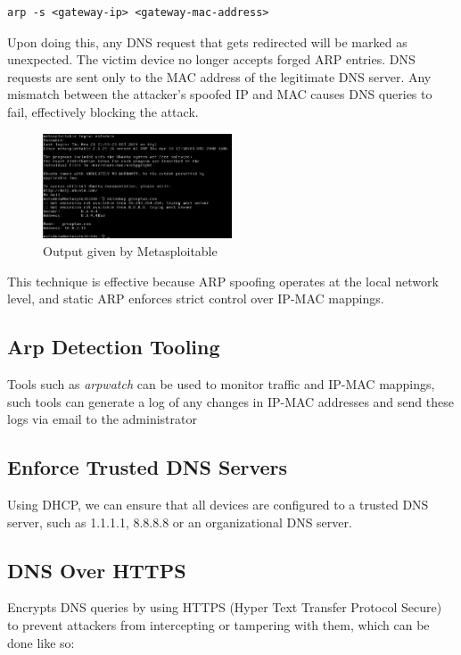 \documentclass[conference,letterpaper]{IEEEtran}
\begin{document}
\begin{lstlisting}
arp -s <gateway-ip> <gateway-mac-address>
\end{lstlisting}

Upon doing this, any DNS request that gets redirected will be marked as unexpected. The victim device no longer accepts forged ARP entries. DNS requests are sent only to the MAC address of the legitimate DNS server. Any mismatch between the attacker’s spoofed IP and MAC causes DNS queries to fail, effectively blocking the attack.\cite{dataDefenseARPSpoofing2018}

\begin{figure}[ht]
  \centering
  \includegraphics[width=0.5\textwidth]{figures/output.jpeg}
  \caption{Output given by Metasploitable}
\end{figure}


This technique is effective because ARP spoofing operates at the local network level, and static ARP enforces strict control over IP-MAC mappings.\cite{trabelsiARPSpoofingComparative2009}
\subsection{Arp Detection Tooling}

Tools such as \textit{arpwatch} \cite{sudhakarSurveyComparativeAnalysis2017} can be used to monitor traffic and IP-MAC mappings, such tools can generate a log of any changes in IP-MAC addresses and send these logs via email to the administrator

\subsection{Enforce Trusted DNS Servers}

Using DHCP, we can ensure that all devices are configured to a trusted DNS server, such as 1.1.1.1, 8.8.8.8 or an organizational DNS server.

\subsection{DNS Over HTTPS}
Encrypts DNS queries by using HTTPS (Hyper Text Transfer Protocol Secure)\cite{maksutovDetectionPreventionDNS2017}\cite{csikorPrivacyDNSoverHTTPSRequiem2021} to prevent attackers from intercepting or tampering with them, which can be done like so:
\end{document}
